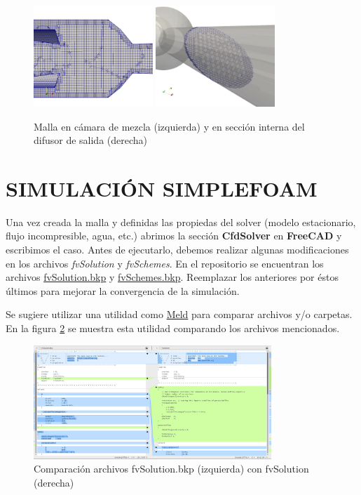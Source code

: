 \documentclass[oneside,a4paper,spanish,links]{amca}
\begin{document}
\begin{figure}[htb]
	\centerline{
		\includegraphics[width=0.4\textwidth]{Figuras/02_MALLA_CAMARA.png}
		\includegraphics[width=0.4\textwidth]{Figuras/02_MALLA_SECCION.png}} \caption{Malla en cámara de mezcla (izquierda) y en sección interna del difusor de salida (derecha)} \label{fg:pv_malla}
\end{figure}

\newpage
\section{SIMULACIÓN SIMPLEFOAM}
Una vez creada la malla y definidas las propiedas del solver (modelo estacionario, flujo incompresible, agua, etc.) abrimos la sección \textbf{CfdSolver} en \textbf{FreeCAD} y escribimos el caso. Antes de ejecutarlo, debemos realizar algunas modificaciones en los archivos \textit{fvSolution} y \textit{fvSchemes}. En el repositorio se encuentran los archivos \href{https://github.com/guillerolle/casos_cfd/tree/master/03/case/system/fvSolution.bkp}{fvSolution.bkp} y \href{https://github.com/guillerolle/casos_cfd/tree/master/03/case/system/fvSchemes.bkp}{fvSchemes.bkp}. Reemplazar los anteriores por éstos últimos para mejorar la convergencia de la simulación.

Se sugiere utilizar una utilidad como \href{https://meldmerge.org}{Meld} para comparar archivos y/o carpetas. En la figura \ref{fg:meld} se muestra esta utilidad comparando los archivos mencionados.

\begin{figure}[htb]
	\centerline{
		\includegraphics[width=0.8\textwidth]{Figuras/03_MELD.png}}
		 \caption{Comparación archivos fvSolution.bkp (izquierda) con fvSolution (derecha)} \label{fg:meld}
\end{figure}
\end{document}
